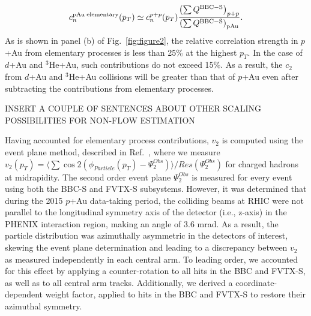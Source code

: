 \documentclass[%
reprint,
showpacs,preprintnumbers,
 amsmath,amssymb,
 aps,
]{revtex4-1}
\newcommand{\pt}{\mbox{$p_T$}\xspace}
\newcommand{\dau}{\mbox{$d$+Au}\xspace}
\newcommand{\pau}{\mbox{$p$+Au}\xspace}
\newcommand{\hau}{\mbox{$^3\text{He}$+Au}\xspace}
\begin{document}
\begin{equation}
c_{n}^{{\rm pAu \; elementary}}(p_{T}) \simeq c_{n}^{p+p}(p_{T})
\frac{\left( \sum Q^{{\rm BBC-S}} \right)_{p+p}}
{\left( \sum Q^{{\rm BBC-S}} \right)_{{\rm pAu}}
}.
\label{eq:dilute}
\end{equation}
As is shown in panel (b) of Fig.~\ref{fig:figure2}, the relative
correlation strength in \pau from elementary processes is less than 25\%
at the highest \pt. In the case of \dau and \hau, such contributions
do not exceed 15\%. As a result, the $c_2$ from \dau and \hau collisions will be greater than that of \pau even after subtracting the contributions from elementary processes.

\color{red}
INSERT A COUPLE OF SENTENCES ABOUT OTHER SCALING POSSIBILITIES FOR NON-FLOW ESTIMATION
\color{black}

Having accounted for elementary process contributions, $v_2$ is computed using the event plane method, described in Ref.~\cite{Adare:2015ctn}, where we measure $v_{2}(p_{T}) = \langle\sum \cos 2(\phi_{Particle}(p_{T})-\Psi^{Obs}_{2})\rangle/Res(\Psi^{Obs}_{2})$ for charged hadrons at midrapidity. The second order event plane $\Psi^{Obs}_{2}$ is measured for every event using both the BBC-S and FVTX-S subsystems. 
However, it was determined that during the 2015 \pau data-taking period, the colliding beams at RHIC were not parallel to the longitudinal symmetry axis of the detector (i.e., z-axis) in the PHENIX interaction region, making an angle of 3.6 mrad. As a result, the particle distribution was azimuthally asymmetric in the detectors of interest, skewing the event plane determination and leading to a discrepancy between $v_2$ as measured independently in each central arm. To leading order, we accounted for this effect by applying a counter-rotation to all hits in the BBC and FVTX-S, as well as to all central arm tracks. Additionally, we derived a coordinate-dependent weight factor, applied to hits in the BBC and FVTX-S to restore their azimuthal symmetry. 
\end{document}
